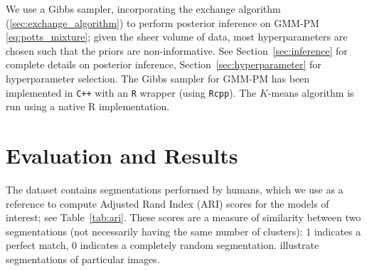 \documentclass[12pt]{article}
\begin{document}
We use a Gibbs sampler, incorporating the exchange algorithm
(\ref{sec:exchange_algorithm}) to perform posterior inference on
GMM-PM \eqref{eq:potts_mixture}; given the sheer volume of data, most
hyperparameters are chosen such that the priors are non-informative.
See Section~\ref{sec:inference} for complete details on posterior inference,
Section~\ref{sec:hyperparameter} for hyperparameter selection.
The Gibbs sampler for GMM-PM has been implemented in \texttt{C++} with an
\texttt{R} wrapper (using \texttt{Rcpp}).
The $K$-means algorithm is run using a native R implementation.



\section{Evaluation and Results}

The dataset contains segmentations performed by humans, which we use as a
reference to compute Adjusted Rand Index (ARI) scores \citep{rand1971} for the
models of interest; see Table~\ref{tab:ari}.
These scores are a measure of similarity between two segmentations (not
necessarily having the same number of clusters): $1$ indicates a perfect match,
$0$ indicates a completely random segmentation.
 illustrate segmentations of
particular images.
\end{document}
